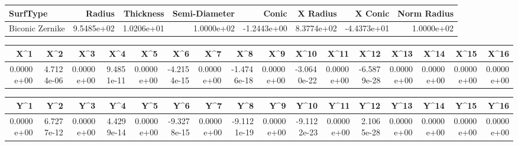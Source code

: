 \documentclass[varwidth=\maxdimen, convert={convertexe={magick.exe}}]{standalone}
\begin{document}
\begin{tabular}{lrrrrrrr}
\toprule
       SurfType &     Radius &  Thickness &  Semi-Diameter &       Conic &   X Radius &     X Conic &  Norm Radius \\
\midrule
Biconic Zernike & 9.5485e+02 & 1.0206e+01 &     1.0000e+02 & -1.2443e+00 & 8.3774e+02 & -4.4373e+01 &   1.0000e+02 \\
\bottomrule
\end{tabular}

\begin{tabular}{rrrrrrrrrrrrrrrr}
\toprule
       X\textasciicircum 1 &        X\textasciicircum 2 &        X\textasciicircum 3 &        X\textasciicircum 4 &        X\textasciicircum 5 &         X\textasciicircum 6 &        X\textasciicircum 7 &         X\textasciicircum 8 &        X\textasciicircum 9 &        X\textasciicircum 10 &       X\textasciicircum 11 &        X\textasciicircum 12 &       X\textasciicircum 13 &       X\textasciicircum 14 &       X\textasciicircum 15 &       X\textasciicircum 16 \\
\midrule
0.0000e+00 & 4.7124e-06 & 0.0000e+00 & 9.4851e-11 & 0.0000e+00 & -4.2154e-15 & 0.0000e+00 & -1.4746e-18 & 0.0000e+00 & -3.0640e-22 & 0.0000e+00 & -6.5879e-28 & 0.0000e+00 & 0.0000e+00 & 0.0000e+00 & 0.0000e+00 \\
\bottomrule
\end{tabular}

\begin{tabular}{rrrrrrrrrrrrrrrr}
\toprule
       Y\textasciicircum 1 &        Y\textasciicircum 2 &        Y\textasciicircum 3 &        Y\textasciicircum 4 &        Y\textasciicircum 5 &         Y\textasciicircum 6 &        Y\textasciicircum 7 &         Y\textasciicircum 8 &        Y\textasciicircum 9 &        Y\textasciicircum 10 &       Y\textasciicircum 11 &       Y\textasciicircum 12 &       Y\textasciicircum 13 &       Y\textasciicircum 14 &       Y\textasciicircum 15 &       Y\textasciicircum 16 \\
\midrule
0.0000e+00 & 6.7277e-12 & 0.0000e+00 & 4.4299e-14 & 0.0000e+00 & -9.3278e-15 & 0.0000e+00 & -9.1121e-19 & 0.0000e+00 & -9.1122e-23 & 0.0000e+00 & 2.1065e-28 & 0.0000e+00 & 0.0000e+00 & 0.0000e+00 & 0.0000e+00 \\
\bottomrule
\end{tabular}
\end{document}
